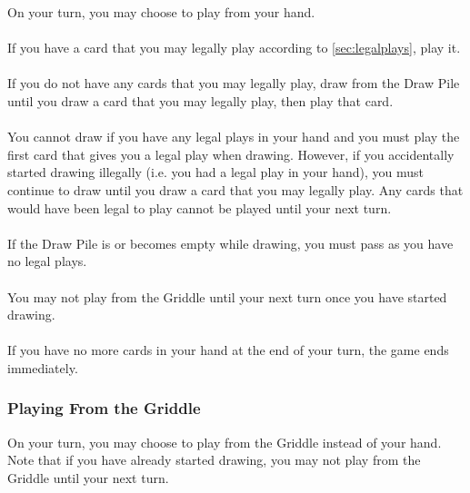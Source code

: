 \documentclass{article}
\begin{document}
On your turn, you may choose to play from your hand.

\paragraph{}
If you have a card that you may legally play according to \autoref{sec:legalplays}, play it.

\paragraph{}
If you do not have any cards that you may legally play, draw from the Draw Pile until you draw a card that you may legally play, then play that card.

\paragraph{}
You cannot draw if you have any legal plays in your hand and you must play the first card that gives you a legal play when drawing.
However, if you accidentally started drawing illegally (i.e. you had a legal play in your hand), you must continue to draw until you draw a card that you may legally play. Any cards that would have been legal to play cannot be played until your next turn.

\paragraph{}
If the Draw Pile is or becomes empty while drawing, you must pass as you have no legal plays.

\paragraph{}
You may not play from the Griddle until your next turn once you have started drawing.

\paragraph{}
If you have no more cards in your hand at the end of your turn, the game ends immediately.

\subsubsection{Playing From the Griddle}
\label{sec:fromstack}

On your turn, you may choose to play from the Griddle instead of your hand. Note that if you have already started drawing, you may not play from the Griddle until your next turn.
\end{document}
